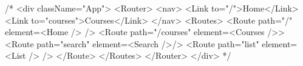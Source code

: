 {/* 
            <div className="App">
            <Router>
                <nav>
                    <Link to="/">Home</Link>
                    <Link to="courses">Courses</Link>
                </nav>
                <Routes>
                    <Route path="/" element={<Home />} />
                    <Route path="/courses" element={<Courses />}>
                        <Route path="search" element={<Search />}/>
                        <Route path="list" element={<List />} />
                    </Route>
                </Routes>
            </Router>
        </div> */}